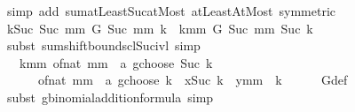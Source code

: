 \begin{isabellebody}
\ {\isacharparenleft}{\kern0pt}simp\ add{\isacharcolon}{\kern0pt}\ sum{\isachardot}{\kern0pt}atLeast{\isacharunderscore}{\kern0pt}Suc{\isacharunderscore}{\kern0pt}atMost\ atLeast{}AtMost\ {\isacharbrackleft}{\kern0pt}symmetric{\isacharbrackright}{\kern0pt}{\isacharparenright}{\kern0pt}\isanewline
\ \ \isamarkupfalse%
\ \isamarkupfalse%
\ {\isachardoublequoteopen}{\isacharparenleft}{\kern0pt}{\isasymSum}k{\isacharequal}{\kern0pt}Suc\ {}{\isachardot}{\kern0pt}{\isachardot}{\kern0pt}Suc\ mm{\isachardot}{\kern0pt}\ G\ {\isacharparenleft}{\kern0pt}Suc\ mm{\isacharparenright}{\kern0pt}\ k{\isacharparenright}{\kern0pt}\ {\isacharequal}{\kern0pt}\ {\isacharparenleft}{\kern0pt}{\isasymSum}k{\isacharequal}{\kern0pt}{}{\isachardot}{\kern0pt}{\isachardot}{\kern0pt}mm{\isachardot}{\kern0pt}\ G\ {\isacharparenleft}{\kern0pt}Suc\ mm{\isacharparenright}{\kern0pt}\ {\isacharparenleft}{\kern0pt}Suc\ k{\isacharparenright}{\kern0pt}{\isacharparenright}{\kern0pt}{\isachardoublequoteclose}\isanewline
\ \ \ \ \isamarkupfalse%
\ {\isacharparenleft}{\kern0pt}subst\ sum{\isachardot}{\kern0pt}shift{\isacharunderscore}{\kern0pt}bounds{\isacharunderscore}{\kern0pt}cl{\isacharunderscore}{\kern0pt}Suc{\isacharunderscore}{\kern0pt}ivl{\isacharparenright}{\kern0pt}\ simp\isanewline
\ \ \isamarkupfalse%
\ \isamarkupfalse%
\ {\isachardoublequoteopen}{\isasymdots}\ {\isacharequal}{\kern0pt}\ {\isacharparenleft}{\kern0pt}{\isasymSum}k{\isacharequal}{\kern0pt}{}{\isachardot}{\kern0pt}{\isachardot}{\kern0pt}mm{\isachardot}{\kern0pt}\ {\isacharparenleft}{\kern0pt}{\isacharparenleft}{\kern0pt}of{\isacharunderscore}{\kern0pt}nat\ mm\ {\isacharplus}{\kern0pt}\ a\ gchoose\ {\isacharparenleft}{\kern0pt}Suc\ k{\isacharparenright}{\kern0pt}{\isacharparenright}{\kern0pt}\ {\isacharplus}{\kern0pt}\isanewline
\ \ \ \ \ \ {\isacharparenleft}{\kern0pt}of{\isacharunderscore}{\kern0pt}nat\ mm\ {\isacharplus}{\kern0pt}\ a\ gchoose\ k{\isacharparenright}{\kern0pt}{\isacharparenright}{\kern0pt}\ {\isacharasterisk}{\kern0pt}\ x{\isacharcircum}{\kern0pt}{\isacharparenleft}{\kern0pt}Suc\ k{\isacharparenright}{\kern0pt}\ {\isacharasterisk}{\kern0pt}\ y{\isacharcircum}{\kern0pt}{\isacharparenleft}{\kern0pt}mm\ {\isacharminus}{\kern0pt}\ k{\isacharparenright}{\kern0pt}{\isacharparenright}{\kern0pt}{\isachardoublequoteclose}\isanewline
\ \ \ \ \isamarkupfalse%
\ G{\isacharunderscore}{\kern0pt}def\ \isamarkupfalse%
\ {\isacharparenleft}{\kern0pt}subst\ gbinomial{\isacharunderscore}{\kern0pt}addition{\isacharunderscore}{\kern0pt}formula{\isacharparenright}{\kern0pt}\ simp\isanewline

\end{isabellebody}
